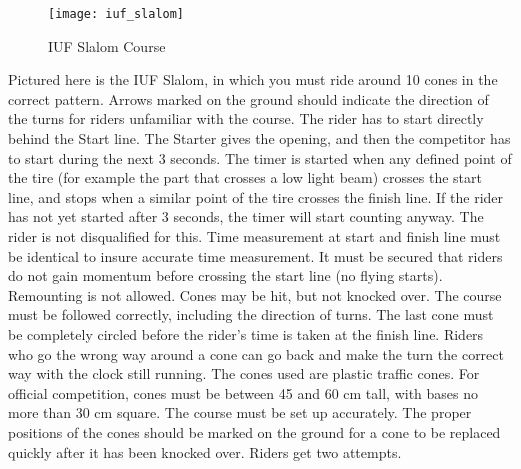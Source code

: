 \begin{figure}[h]
\begin{center}
\texttt{[image: iuf\_slalom]}
\end{center}
\vspace{-20pt}
\caption{IUF Slalom Course \label{fig:iuf_slalom}}
\vspace{-10pt}
\end{figure}
Pictured here is the IUF Slalom, in which you must ride around 10 cones in the correct pattern.
Arrows marked on the ground should indicate the direction of the turns for riders unfamiliar with the course.
The rider has to start directly behind the Start line.
The Starter gives the opening, and then the competitor has to start during the next 3 seconds.
The timer is started when any defined point of the tire (for example the part that crosses a low light beam) crosses the start line, and stops when a similar point of the tire crosses the finish line.
If the rider has not yet started after 3 seconds, the timer will start counting anyway.
The rider is not disqualified for this.
Time measurement at start and finish line must be identical to insure accurate time measurement.
It must be secured that riders do not gain momentum before crossing the start line (no flying starts).
Remounting is not allowed.
Cones may be hit, but not knocked over.
The course must be followed correctly, including the direction of turns.
The last cone must be completely circled before the rider's time is taken at the finish line.
Riders who go the wrong way around a cone can go back and make the turn the correct way with the clock still running.
The cones used are plastic traffic cones.
For official competition, cones must be between 45 and 60 cm tall, with bases no more than 30 cm square.
The course must be set up accurately.
The proper positions of the cones should be marked on the ground for a cone to be replaced quickly after it has been knocked over.
Riders get two attempts.
